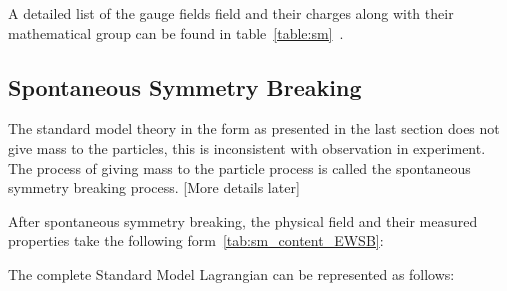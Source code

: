     



A detailed list of the gauge fields field and their charges along with their mathematical group can be found in table~\ref{table:sm}~\cite{Antrim:2699575}. 

\subsection*{Spontaneous Symmetry Breaking}
The standard model theory in the form as presented in the last section does not give mass to the particles, this is inconsistent with observation in experiment. The process of giving mass to the particle process is called the spontaneous symmetry breaking process.
[More details later]



After spontaneous symmetry breaking, the physical field and their measured properties take the following form~\ref{tab:sm_content_EWSB}:
    
    The complete Standard Model Lagrangian can be represented as follows:

